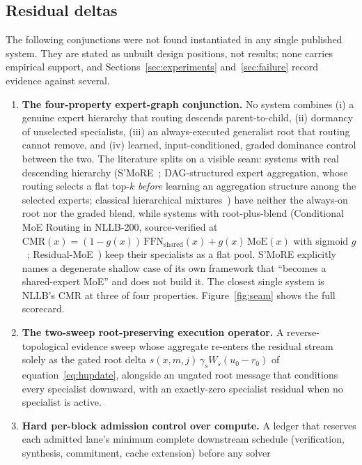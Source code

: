 \documentclass[10pt,a4paper]{article}
\begin{document}
\subsection{Residual deltas}

The following conjunctions were not found instantiated in any single
published system. They are stated as unbuilt design positions, not results;
none carries empirical support, and Sections~\ref{sec:experiments}
and~\ref{sec:failure} record evidence against several.

\begin{enumerate}[label=\textbf{D\arabic*.},leftmargin=2.8em]
\item \textbf{The four-property expert-graph conjunction.} No system combines
  (i) a genuine expert hierarchy that routing descends parent-to-child,
  (ii) dormancy of unselected specialists, (iii) an always-executed
  generalist root that routing cannot remove, and (iv) learned,
  input-conditioned, graded dominance control between the two. The
  literature splits on a visible seam: systems with real descending
  hierarchy (S'MoRE~\cite{smore2025}; DAG-structured expert aggregation,
  whose routing selects a flat top-$k$ \emph{before} learning an aggregation
  structure among the selected experts; classical hierarchical
  mixtures~\cite{jordan1994}) have neither the always-on root nor the graded
  blend, while systems with root-plus-blend (Conditional MoE Routing in
  NLLB-200, source-verified at
  $\mathrm{CMR}(x)=(1-g(x))\,\mathrm{FFN}_{\mathrm{shared}}(x)+g(x)\,\mathrm{MoE}(x)$
  with sigmoid $g$~\cite{nllb2022}; Residual-MoE~\cite{rajbhandari2022})
  keep their specialists as a flat pool. S'MoRE explicitly names a
  degenerate shallow case of its own framework that ``becomes a
  shared-expert MoE'' and does not build it. The closest single system is
  NLLB's CMR at three of four properties. Figure~\ref{fig:seam} shows the
  full scorecard.
\item \textbf{The two-sweep root-preserving execution operator.} A
  reverse-topological evidence sweep whose aggregate re-enters the residual
  stream solely as the gated root delta
  $s(x,m,j)\,\gamma_s W_s (u_0 - r_0)$ of equation~\eqref{eq:hupdate},
  alongside an ungated root message that conditions every specialist
  downward, with an exactly-zero specialist residual when no specialist is
  active.
\item \textbf{Hard per-block admission control over compute.} A ledger that
  reserves each admitted lane's minimum complete downstream schedule
  (verification, synthesis, commitment, cache extension) before any solver

\end{enumerate}
\end{document}
